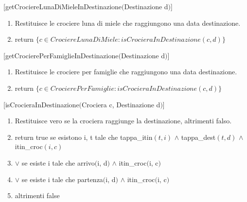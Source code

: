\documentclass{article}
\begin{document}
[getCrociereLunaDiMieleInDestinazione$($Destinazione d$)$]
\begin{enumerate}
    \item Restituisce le crociere luna di miele che raggiungono una data destinazione.
    \item return $\{c \in CrociereLunaDiMiele: isCrocieraInDestinazione(c, d)\}$
\end{enumerate}
\space

[getCrocierePerFamiglieInDestinazione$($Destinazione d$)$]
\begin{enumerate}
    \item Restituisce le crociere per famiglie che raggiungono una data destinazione.
    \item return $\{c \in CrocierePerFamiglie: isCrocieraInDestinazione(c, d)\}$
\end{enumerate}
\space

[isCrocieraInDestinazione$($Crociera c, Destinazione d$)$]
\begin{enumerate}
    \item Restituisce vero se la crociera raggiunge la destinazione, altrimenti falso.
    \item return true se esistono i, t tale che tappa\_itin$(t, i)$ $\land$ tappa\_dest$(t, d)$ $\land$ itin\_croc$(i, c)$
    \item $\lor$ se esiste i tale che arrivo$($i, d$)$ $\land$ itin\_croc$($i, c$)$
    \item $\lor$ se esiste i tale che partenza$($i, d$)$ $\land$ itin\_croc$($i, c$)$
    \item altrimenti false
\end{enumerate}
\end{document}
